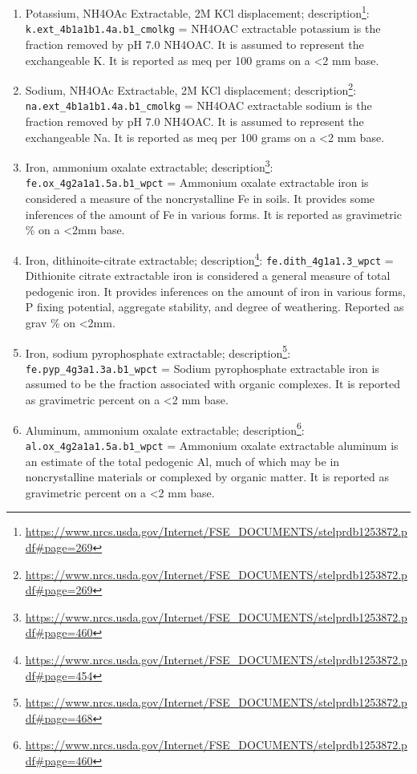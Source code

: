 \documentclass[
  graybox,natbib,nospthms]{svmono}
\renewcommand{\href}[2]{#2 (\url{#1})}
\renewcommand{\href}[2]{#2\footnote{\url{#1}}}
\begin{document}
\begin{enumerate}
\item
  Potassium, NH4OAc Extractable, 2M KCl displacement; \href{https://www.nrcs.usda.gov/Internet/FSE_DOCUMENTS/stelprdb1253872.pdf\#page=269}{description}: \texttt{k.ext\_4b1a1b1.4a.b1\_cmolkg} = NH4OAC extractable potassium is the fraction removed by pH 7.0 NH4OAC. It is assumed to represent the exchangeable K. It is reported as meq per 100 grams on a \textless2 mm base.\\
\item
  Sodium, NH4OAc Extractable, 2M KCl displacement; \href{https://www.nrcs.usda.gov/Internet/FSE_DOCUMENTS/stelprdb1253872.pdf\#page=269}{description}: \texttt{na.ext\_4b1a1b1.4a.b1\_cmolkg} = NH4OAC extractable sodium is the fraction removed by pH 7.0 NH4OAC. It is assumed to represent the exchangeable Na. It is reported as meq per 100 grams on a \textless2 mm base.\\
\item
  Iron, ammonium oxalate extractable; \href{https://www.nrcs.usda.gov/Internet/FSE_DOCUMENTS/stelprdb1253872.pdf\#page=460}{description}: \texttt{fe.ox\_4g2a1a1.5a.b1\_wpct} = Ammonium oxalate extractable iron is considered a measure of the noncrystalline Fe in soils. It provides some inferences of the amount of Fe in various forms. It is reported as gravimetric \% on a \textless2mm base.\\
\item
  Iron, dithinoite-citrate extractable; \href{https://www.nrcs.usda.gov/Internet/FSE_DOCUMENTS/stelprdb1253872.pdf\#page=454}{description}: \texttt{fe.dith\_4g1a1.3\_wpct} = Dithionite citrate extractable iron is considered a general measure of total pedogenic iron. It provides inferences on the amount of iron in various forms, P fixing potential, aggregate stability, and degree of weathering. Reported as grav \% on \textless2mm.\\
\item
  Iron, sodium pyrophosphate extractable; \href{https://www.nrcs.usda.gov/Internet/FSE_DOCUMENTS/stelprdb1253872.pdf\#page=468}{description}: \texttt{fe.pyp\_4g3a1.3a.b1\_wpct} = Sodium pyrophosphate extractable iron is assumed to be the fraction associated with organic complexes. It is reported as gravimetric percent on a \textless2 mm base.\\
\item
  Aluminum, ammonium oxalate extractable; \href{https://www.nrcs.usda.gov/Internet/FSE_DOCUMENTS/stelprdb1253872.pdf\#page=460}{description}: \texttt{al.ox\_4g2a1a1.5a.b1\_wpct} = Ammonium oxalate extractable aluminum is an estimate of the total pedogenic Al, much of which may be in noncrystalline materials or complexed by organic matter. It is reported as gravimetric percent on a \textless2 mm base.\\

\end{enumerate}
\end{document}
